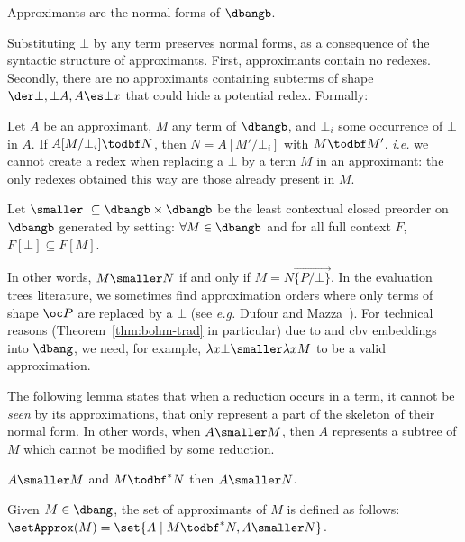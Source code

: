 \begin{lemma}
	Approximants are the normal forms of $\dbangb$. 
\end{lemma}
Substituting $\bot$ by any term preserves normal forms, as a consequence of the syntactic structure of
approximants. First, approximants contain no redexes. Secondly, 
there are no approximants containing
subterms of shape $\der \bot, \bot A, A\es\bot x$ that could hide a
potential redex. Formally:
\begin{lemma}
	\label{lem:approx_bot}
	Let $A$ be an approximant, $M$ any term of $\dbangb$, and $\bot_i$ some
	occurrence of $\bot$ in $A$. If	$A[M/\bot_i]\todbf N$, then
	$N=A[M'/\bot_i]$ with $M\todbf M'$. \emph{i.e.} we cannot create a redex
	when replacing a $\bot$ by a term $M$ in an approximant: the only redexes
	obtained this way are those already present in $M$.
\end{lemma}

\begin{definition}[Order]
Let $\smaller\ \subseteq \dbangb\times \dbangb$ be the least contextual closed
	preorder on $\dbangb$ generated by setting: 
 $\forall M\in \dbangb$ and for all full context $F$, $F[\bot] \subseteq F[M]$. 
\end{definition}
In other words, $M\smaller N$ if and only if $M=N\overrightarrow{\{P/\bot\}}$. In
the evaluation trees literature, we sometimes find approximation orders where only
terms of shape $\oc P$ are replaced by a $\bot$ (see \emph{e.g.} Dufour and
Mazza~\cite{mazza-dufour}). For technical reasons (Theorem~\ref{thm:bohm-trad} in
particular) due to \cbn{} and
cbv{} embeddings into $\dbang$, we need, for example, $\lambda
x\bot\smaller\lambda xM$ to be a valid approximation.

The following lemma states that when a reduction occurs in a term,
it cannot be \emph{seen} by its approximations, that only represent a part of
the skeleton of their normal form. In other words, when $A\smaller M$, then
$A$ represents a subtree of $M$ which cannot be modified by some reduction.

\begin{lemma}
	\label{lem:bang:bohm:reduce-have-at-least-same-approxs}
	$A\smaller M$ and $M \todbf^* N$ then $A\smaller N$.
\end{lemma}

\begin{definition}
\label{def:bang:bohm:approx-set}
Given $M \in \dbang$, the set of approximants of $M$ is defined as follows:
$\setApprox(M) = \set{A \mid M \todbf^* N, A \smaller N}$.
\end{definition}

